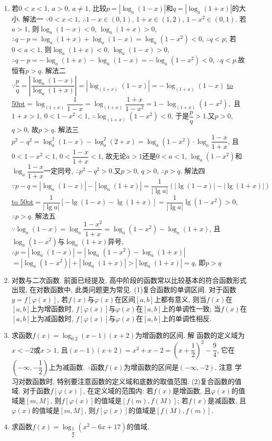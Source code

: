 \documentclass[10pt,a4paper]{article}
\newcommand{\blank}[1]{\underline{\hbox to #1pt{}}}
\begin{document}
\begin{enumerate}[1.]
\item 若$0<x<1$, $a>0$, $a\ne 1$, 比较$p=|\log _a(1-x)|$和$q=|\log _a(1+x)|$的大小.
解法一  $\because 0<x<1$, $\therefore 1-x\in (0,1)$, $1+x\in (1,2)$, $1-x^2\in (0,1)$.
若$a>1$, 则$\log _a(1-x)<0$, $\log _a(1+x)>0$,
$\therefore q-p=\log _a(1+x)+\log _a(1-x)=\log _a(1-x^2)<0$, $\therefore q<p$;
若$0<a<1$, 则$\log _a(1+x)<0$, $\log _a(1-x)>0$,
$\therefore q-p=-\log _a(1+x)-\log _a(1-x)=-\log _a(1-x^2)<0$, $\therefore q<p$.故恒有$p>q$.
解法二  $\because \dfrac pq=|\dfrac{\log _a(1-x)}{\log _a(1+x)}|=|\log _{(1+x)}(1-x)|=-\log _{(1+x)}(1-x)$
\blank{50}$=\log _{(1+x)}\dfrac 1{1-x}=\log _{(1+x)}\dfrac{1+x}{1-x^2}=1-\log _{(1+x)}(1-x^2),$
且$1+x>1$, $0<1-x^2<1$, $\therefore \log _{(1+x)}(1-x^2)<0$, 于是$\dfrac pq>1$.又$p>0$, $q>0$, 故$p>q$.
解法三  $p^2-q^2=\log _a^2(1-x)-\log _a^2(2+x)=\log _a(1-x^2)\cdot \log _a\dfrac{1-x}{1+x}$,
且$0<1-x^2<1$, $0<\dfrac{1-x}{1+x}<1$, 故无论$a>1$还是$0<a<1$, $\log _a(1-x^2)$和$\log _a\dfrac{1-x}{1+x}$一定同号, $\therefore p^2-q^2>0$.又$p>0$, $q>0$, $\therefore p>q$.
解法四  $\because p-q=|\log _a(1-x)|-|\log _a(1+x)|=\dfrac 1{|\lg a|}(|\lg (1-x)|-|\lg (1+x)|)$
\blank{50}$=\dfrac 1{|\lg a|}[-\lg (1-x)-\lg (1+x)]=\dfrac 1{|\lg a|}\lg (1-x^2)>0$,
$\therefore p>q$.
解法五  $\because \log _a(1-x)=\log _a\dfrac{1-x^2}{1+x}=\log _a(1-x^2)-\log _a(1+x)$,
且$\log _a(1-x^2)$与$\log _a(1+x)$异号,
$\therefore p=|\log _a(1-x)|=|\log _a(1-x^2)-\log _a(1+x)|$
    $=|\log _a(1-x^2)|+|\log _a(1+x)|>|\log _a(1+x)|=q$,
即$p>q$
\item 对数与二次函数.
前面已经提及, 高中阶段的函数常以比较基本的符合函数形式出现, 在对数函数中, 此类问题更为常见.
(1)复合函数的单调区间.
对于函数$y=f[\varphi (x)]$, 若$f(x)$与$\varphi (x)$在区间$[a,b]$上都有意义, 则当$f(x)$在$[a,b]$上为增函数时, $f[\varphi (x)]$与$\varphi (x)$在$[a,b]$上的单调性一致; 当$f(x)$在$[a,b]$上为减函数时, $f[\varphi (x)]$与$\varphi (x)$在$[a,b]$上的单调性相反.
\item 求函数$f(x)=\log _{0.2}(x-1)(x+2)$为增函数的区间.
解  函数的定义域为$x<-2$或$x>1$, 且$(x-1)(x+2)=x^2+x-2=(x+\dfrac 12)^2-\dfrac 94$, 它在$(-\infty ,-\dfrac 12)$上为减函数.
$\therefore$函数$f(x)$为增函数的区间是$(-\infty ,-2)$.
注意  学习对数函数时, 特别要注意函数的定义域和底数的取值范围.
(2)复合函数的值域.
对于函数$f[\varphi (x)]$, 在定义域的范围内:
若$f(x)$是增函数, 且$\varphi (x)$的值域是$[m,M]$, 则$f[\varphi (x)]$的值域是$[f(m),f(M)]$;
若$f(x)$是减函数, 且$\varphi (x)$的值域是$[m,M]$, 则$f[\varphi (x)]$的值域是$[f(M),f(m)]$.
\item 求函数$f(x)=\log _{\dfrac 12}(x^2-6x+17)$的值域.

\end{enumerate}
\end{document}
